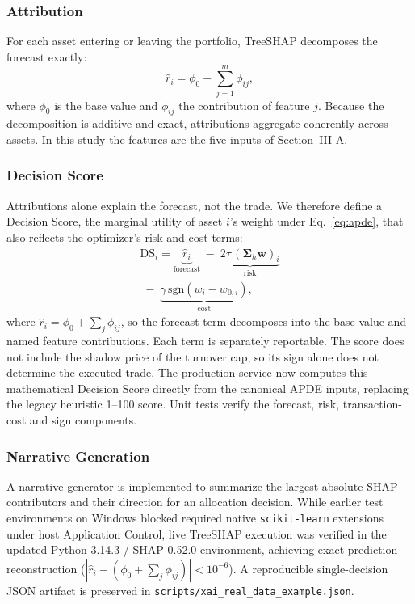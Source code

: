 \documentclass[conference]{IEEEtran}
\begin{document}
\subsubsection{Attribution}
For each asset entering or leaving the portfolio, TreeSHAP
\cite{lundberg2020} decomposes the forecast exactly:
\begin{equation}
\hat{r}_i = \phi_0 + \sum_{j=1}^{m} \phi_{ij},
\label{eq:shap}
\end{equation}
where $\phi_0$ is the base value and $\phi_{ij}$ the contribution of
feature $j$. Because the decomposition is additive and exact,
attributions aggregate coherently across assets. In this study the
features are the five inputs of Section~III-A.

\subsubsection{Decision Score}
Attributions alone explain the forecast, not the trade. We therefore
define a Decision Score, the marginal utility of asset $i$'s weight
under Eq.~\eqref{eq:apde}, that also reflects the optimizer's risk and
cost terms:
\begin{multline}
\mathrm{DS}_i = \underbrace{\hat{r}_i}_{\text{forecast}}
\;-\; \underbrace{2\tau\,(\mathbf{\Sigma}_h\mathbf{w})_i}_{\text{risk}}\\
\;-\; \underbrace{\gamma\,\mathrm{sgn}(w_i - w_{0,i})}_{\text{cost}} ,
\label{eq:ds}
\end{multline}
where $\hat{r}_i=\phi_0+\sum_j\phi_{ij}$, so the forecast term
decomposes into the base value and named feature contributions. Each
term is separately reportable. The score does not include the shadow
price of the turnover cap, so its sign alone does not determine the
executed trade. The production service now computes this mathematical
Decision Score directly from the canonical APDE inputs, replacing the
legacy heuristic 1--100 score. Unit tests verify the forecast, risk,
transaction-cost and sign components.

\subsubsection{Narrative Generation}
A narrative generator is implemented to summarize the largest absolute
SHAP contributors and their direction for an allocation decision.
While earlier test environments on Windows blocked required native
\texttt{scikit-learn} extensions under host Application Control, live
TreeSHAP execution was verified in the updated Python 3.14.3 / SHAP 0.52.0
environment, achieving exact prediction reconstruction ($|\hat{r}_i - (\phi_0 + \sum_j \phi_{ij})| < 10^{-6}$).
A reproducible single-decision JSON artifact is preserved in
\texttt{scripts/xai\_real\_data\_example.json}.
\end{document}

